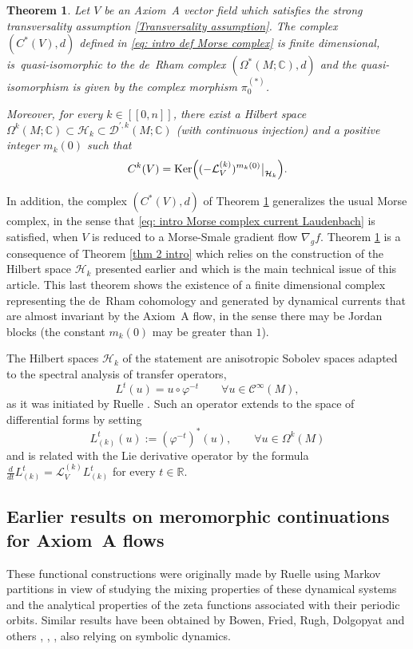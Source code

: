 \documentclass[11pt]{article}
\newcommand{\Subsection}{\subsection}
\newcommand{\lcr}{[\![}
\newcommand{\rcr}{]\!]}
\theoremstyle{definition}
\theoremstyle{plain}
\newtheorem{thm}{Theorem}
\newcommand{\Ccal}{\mathcal{C}}
\newcommand{\C}{\mathbb{C}}
\newcommand{\D}{\mathcal{D}}
\newcommand{\Hil}{\mathcal{H}}
\newcommand{\Lie}{\mathcal{L}}
\newcommand{\R}{\mathbb{R}}
\DeclareMathOperator{\Ker}{Ker}
\def\rest#1#2{\mathchoice
{\setbox1\hbox{${\displaystyle #1}_{\scriptstyle #2}$}
\restrictionaux{#1}{#2}}
{\setbox1\hbox{${\textstyle #1}_{\scriptstyle #2}$}
\restrictionaux{#1}{#2}}
{\setbox1\hbox{${\scriptstyle #1}_{\scriptscriptstyle #2}$}
\restrictionaux{#1}{#2}}
{\setbox1\hbox{${\scriptscriptstyle #1}_{\scriptscriptstyle #2}$}
\restrictionaux{#1}{#2}}}
\def\restrictionaux#1#2{{#1\,\smash{\vrule height.8\ht1 depth.85\dp1}}_{\,#2}}
\begin{document}
\begin{thm}\label{thm intro}
Let $V$ be an Axiom~A vector field which satisfies the strong transversality assumption \eqref{Transversality assumption}. The complex $(C^* (V),d)$ defined in \eqref{eq: intro def Morse complex} is finite dimensional, is~quasi-isomorphic to the de~Rham complex $(\Omega^* (M;\C),d)$ and the quasi-isomorphism is given by the complex morphism $\pi_0^{(*)}$.

Moreover, for every $k\in\lcr0,n\rcr$, there exist a Hilbert space $\Omega^k (M;\C) \subset \Hil_k \subset \D^{\prime,k} (M;\C)$ (with continuous injection) and a positive integer $m_k (0)$ such that
\[
C^k (V) = \Ker \Bigl(\rest{(-\Lie_V^{(k)})^{m_{k} (0)}}{\Hil_{k}} \Bigr).
\]
\end{thm}

In addition, the complex $(C^* (V), d)$ of Theorem \ref{thm intro} generalizes the usual Morse complex, in the sense that \eqref{eq: intro Morse complex current Laudenbach} is satisfied, when $V$ is reduced to a Morse-Smale gradient flow $\nabla_g f$. Theorem \ref{thm intro} is a consequence of Theorem \ref{thm 2 intro} which relies on the construction of the Hilbert space $\Hil_k$ presented earlier and which is the main technical issue of this article. This last theorem shows the existence of a finite dimensional complex representing the de~Rham cohomology and generated by dynamical currents that are almost invariant by the Axiom~A flow, in the sense there may be Jordan blocks (the constant $m_k (0)$ may be greater than $1$).

The Hilbert spaces $\Hil_k$ of the statement are anisotropic Sobolev spaces adapted to the spectral analysis of transfer operators,
\[
L^t (u) = u \circ \varphi^{-t} \qquad \forall u \in \Ccal^{\infty} (M),
\]
as it was initiated by Ruelle \cite{ruelle, ruelle_book}. Such an operator extends to the space of differential forms by setting
\[
L_{(k)}^t (u):= (\varphi^{-t})^* (u), \qquad \forall u \in \Omega^k (M)
\]
and is related with the Lie derivative operator by the formula $\frac{d}{dt} L_{(k)}^t = \Lie_V^{(k)} L_{(k)}^t$ for every $t \in \R$.

\Subsection{Earlier results on meromorphic continuations for Axiom~A flows}

These functional constructions were originally made by Ruelle using Markov partitions in view of studying the mixing properties of these dynamical systems and the analytical properties of the zeta functions associated with their periodic orbits. Similar results have been obtained by Bowen, Fried, Rugh, Dolgopyat and others \cite{bowen2}, \cite{fried_meromorphic}, \cite{rugh}, \cite{dolgopyat} also relying on symbolic dynamics.
\end{document}

